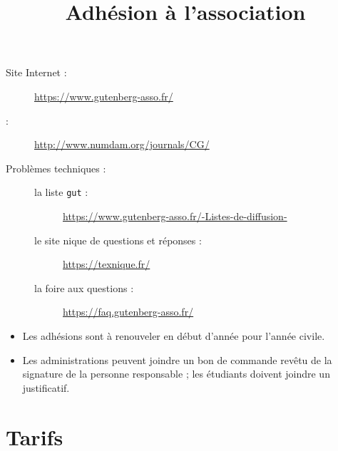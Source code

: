 \begin{description}
\item[Site Internet :] \url{https://www.gutenberg-asso.fr/}
\item[\Cahiers{} :] \url{http://www.numdam.org/journals/CG/}
\item[Problèmes techniques :]
  \leavevmode
  \begin{description}
  \item[la liste \texttt{gut} :]
    \url{https://www.gutenberg-asso.fr/-Listes-de-diffusion-}
  \item[le site nique de questions et réponses :]
    \url{https://texnique.fr/}
  \item[la foire aux questions :]
    \url{https://faq.gutenberg-asso.fr/}
  \end{description}
\end{description}
%

\title{Adhésion à l'association}
\label{letgut_label_adhesions}

\begin{itemize}
\item %
  Les adhésions sont à renouveler  en début d'année
  pour l'année civile.
\item Les administrations peuvent joindre un bon de commande
  revêtu de la signature de la personne responsable ;
  les étudiants doivent joindre un justificatif.
\end{itemize}

\vspace*{-0.7cm}
\section{Tarifs \the\year}

